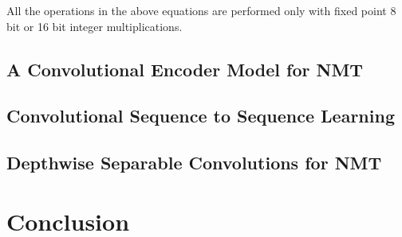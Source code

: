 \documentclass[a4paper]{article}
\begin{document}
All the operations in the above equations are performed only with fixed point 8 bit or 16 bit integer multiplications.


\subsection{A Convolutional Encoder Model for NMT}


\subsection{Convolutional Sequence to Sequence Learning}


\subsection{Depthwise Separable Convolutions for NMT}


\section{Conclusion}






\end{document}
